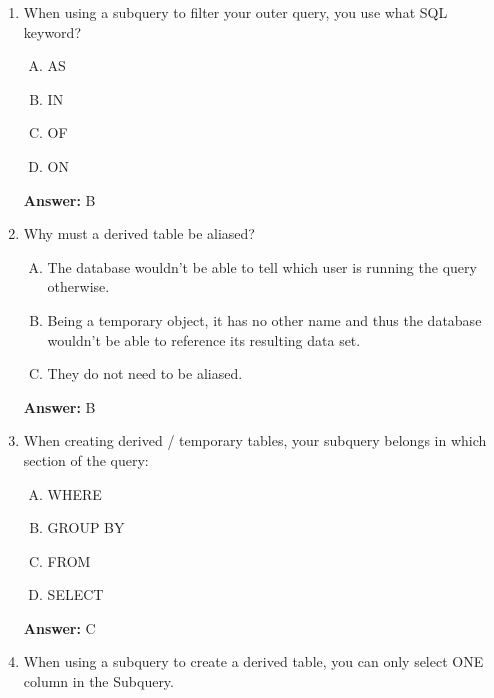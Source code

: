\documentclass[12pt]{article}
\begin{document}
\begin{enumerate}[1.]
    \item

    When using a subquery to filter your outer query, you use what SQL keyword?

    \begin{enumerate}[A.]
        \item AS
        \item IN
        \item OF
        \item ON
    \end{enumerate}

    \bigskip

    \textbf{Answer:} B

    \item

    Why must a derived table be aliased?

    \begin{enumerate}[A.]
        \item The database wouldn’t be able to tell which user is running the query otherwise.
        \item Being a temporary object, it has no other name and thus the database wouldn’t be able to reference its resulting data set.
        \item They do not need to be aliased.

    \end{enumerate}

    \bigskip

    \textbf{Answer:} B

    \item

    When creating derived / temporary tables, your subquery belongs in which
    section of the query:

    \begin{enumerate}[A.]
        \item WHERE
        \item GROUP BY
        \item FROM
        \item SELECT
    \end{enumerate}

    \bigskip

    \textbf{Answer:} C

    \item

    When using a subquery to create a derived table, you can only select ONE
    column in the Subquery.


\end{enumerate}
\end{document}
